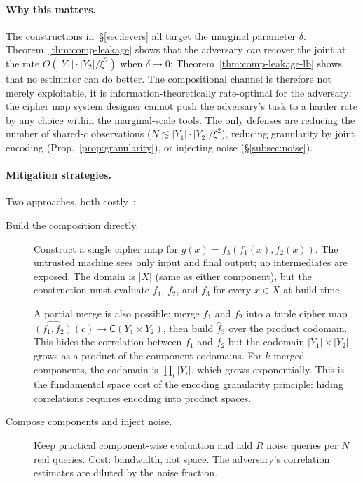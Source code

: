 \documentclass[11pt]{article}
\theoremstyle{definition}
\theoremstyle{plain}
\theoremstyle{remark}
\newcommand{\fhat}{\hat{f}}
\newcommand{\cipher}[1]{\mathsf{C}(#1)}
\begin{document}
\paragraph{Why this matters.}
The constructions in~\S\ref{sec:levers} all target the marginal
parameter $\delta$.  Theorem~\ref{thm:comp-leakage} shows that the
adversary \emph{can} recover the joint at the rate
$O(|Y_1|\cdot|Y_2|/\xi^2)$ when $\delta \to 0$;
Theorem~\ref{thm:comp-leakage-lb} shows that no estimator can do
better.  The compositional channel is therefore not merely
exploitable, it is information-theoretically rate-optimal for the
adversary: the cipher map system designer cannot push the adversary's
task to a harder rate by any choice within the marginal-scale tools.
The only defenses are reducing the number of shared-$c$ observations
($N \lesssim |Y_1|\cdot|Y_2|/\xi^2$), reducing granularity by joint
encoding (Prop.~\ref{prop:granularity}), or injecting noise
(\S\ref{subsec:noise}).

\paragraph{Mitigation strategies.}
Two approaches, both costly~\cite[Sec.~8.2]{towell2026cipher}:

\begin{description}
\item[Build the composition directly.]  Construct a single cipher map for
  $g(x) = f_3(f_1(x), f_2(x))$.  The untrusted machine sees only
  input and final output; no intermediates are exposed.  The domain is
  $|X|$ (same as either component), but the construction must evaluate
  $f_1$, $f_2$, and $f_3$ for every $x \in X$ at build time.

  A partial merge is also possible: merge $f_1$ and $f_2$ into a tuple
  cipher map $\widehat{(f_1, f_2)}(c) \to \cipher{Y_1 \times Y_2}$,
  then build $\fhat_3$ over the product codomain.
  This hides the correlation between $f_1$ and $f_2$ but the codomain
  $|Y_1| \times |Y_2|$ grows as a product of the component codomains.
  For $k$ merged components, the codomain is $\prod_i |Y_i|$, which
  grows exponentially.
  This is the fundamental space cost of the encoding granularity
  principle: hiding correlations requires encoding into product spaces.

\item[Compose components and inject noise.]  Keep practical
  component-wise evaluation and add $R$ noise queries per $N$ real
  queries.  Cost: bandwidth, not space.  The adversary's correlation
  estimates are diluted by the noise fraction.
\end{description}
\end{document}
